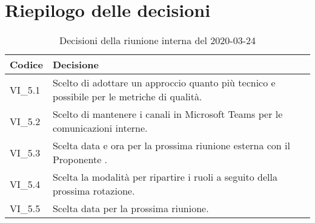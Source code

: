 \section{Riepilogo delle decisioni}
\begin{longtable}{ 
	 >{\centering}p{} >{}p{} }
	
	\caption{Decisioni della riunione interna del 2020-03-24}\\	
	
	\textbf{\color{white}Codice} & 
	\textbf{\color{white}Decisione} 
	\tabularnewline  
	\endhead
	
	VI\_5.1 & Scelto di adottare un approccio quanto più tecnico e possibile per le metriche di qualità. \\
	VI\_5.2 & Scelto di mantenere i canali in Microsoft Teams\ped{\textit{G}} per le comunicazioni interne. \\
	VI\_5.3 & Scelta data e ora per la prossima riunione esterna con il Proponente  \Proponente. \\
	VI\_5.4 & Scelta la modalità per ripartire i ruoli a seguito della prossima rotazione. \\
	VI\_5.5 & Scelta data per la prossima riunione. \\
	
\end{longtable}